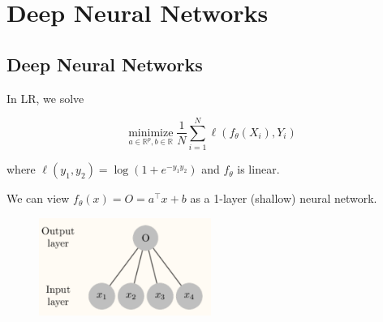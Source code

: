 \chapter{Deep Neural Networks}

\section{Deep Neural Networks}

\begin{concept}
    In LR, we solve

    $$
    \underset{a \in \mathbb{R}^{p}, b \in \mathbb{R}}{\operatorname{minimize}} \frac{1}{N} \sum_{i=1}^{N} \ell\left(f_{\theta}\left(X_{i}\right), Y_{i}\right)
    $$

    where $\ell\left(y_{1}, y_{2}\right)=\log \left(1+e^{-y_{1} y_{2}}\right)$ and $f_{\theta}$ is linear.

    We can view $f_{\theta}(x)=O=a^{\top} x+b$ as a 1-layer (shallow) neural network.

    \begin{figure}[H]
        \centering
        \includegraphics[width=0.5\textwidth]{.././assets/4.1.png}
    \end{figure}
\end{concept}

